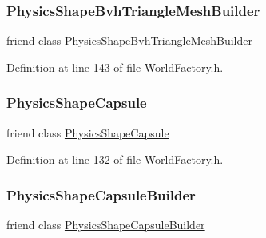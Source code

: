 \subsubsection{\texorpdfstring{Physics\+Shape\+Bvh\+Triangle\+Mesh\+Builder}{PhysicsShapeBvhTriangleMeshBuilder}}
{\footnotesize\ttfamily friend class \mbox{\hyperlink{classnjli_1_1_physics_shape_bvh_triangle_mesh_builder}{Physics\+Shape\+Bvh\+Triangle\+Mesh\+Builder}}\hspace{0.3cm}{\ttfamily [friend]}}



Definition at line 143 of file World\+Factory.\+h.

\mbox{\label{classnjli_1_1_world_factory_a08be67d95b7957ebd88a3944ff9a7afa}} 
\subsubsection{\texorpdfstring{Physics\+Shape\+Capsule}{PhysicsShapeCapsule}}
{\footnotesize\ttfamily friend class \mbox{\hyperlink{classnjli_1_1_physics_shape_capsule}{Physics\+Shape\+Capsule}}\hspace{0.3cm}{\ttfamily [friend]}}



Definition at line 132 of file World\+Factory.\+h.

\mbox{\label{classnjli_1_1_world_factory_a47391e36c657b268fe97217194bf713e}} 
\subsubsection{\texorpdfstring{Physics\+Shape\+Capsule\+Builder}{PhysicsShapeCapsuleBuilder}}
{\footnotesize\ttfamily friend class \mbox{\hyperlink{classnjli_1_1_physics_shape_capsule_builder}{Physics\+Shape\+Capsule\+Builder}}\hspace{0.3cm}{\ttfamily [friend]}}



